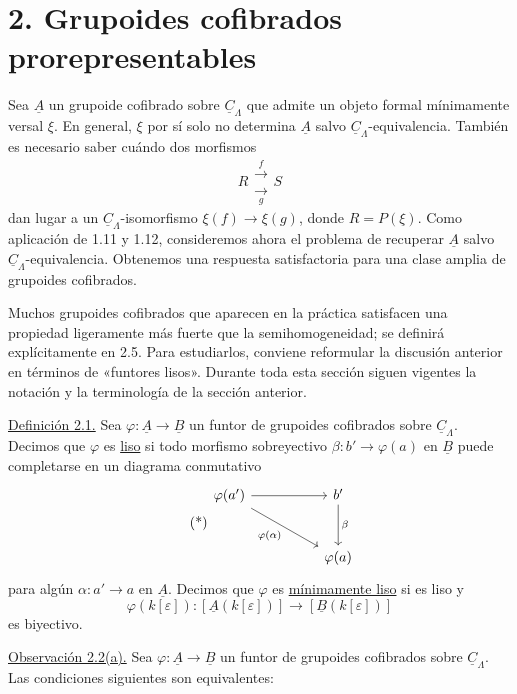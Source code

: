 \section*{2. Grupoides cofibrados prorepresentables}

Sea $\underline A$ un grupoide cofibrado sobre
$\underline C_\Lambda$ que admite un objeto formal mínimamente versal
$\xi$. En general, $\xi$ por sí solo no determina $\underline A$
salvo $\underline C_\Lambda$-equivalencia. También es necesario saber
cuándo dos morfismos
\[
 R\mathrel{\substack{\xrightarrow{\ f\ }\\[-.6ex]
                      \xrightarrow[\ g\ ]{}}}S
\]
dan lugar a un $\underline C_\Lambda$-isomorfismo
$\xi(f)\longrightarrow\xi(g)$, donde $R=P(\xi)$. Como aplicación de
1.11 y 1.12, consideremos ahora el problema de recuperar $\underline A$
salvo $\underline C_\Lambda$-equivalencia. Obtenemos una respuesta
satisfactoria para una clase amplia de grupoides cofibrados.


Muchos grupoides cofibrados que aparecen en la práctica satisfacen una
propiedad ligeramente más fuerte que la semihomogeneidad; se definirá
explícitamente en 2.5. Para estudiarlos, conviene reformular la
discusión anterior en términos de «funtores lisos». Durante toda esta
sección siguen vigentes la notación y la terminología de la sección
anterior.

\underline{Definición 2.1.} Sea
$\varphi:\underline A\longrightarrow\underline B$ un funtor de
grupoides cofibrados sobre $\underline C_\Lambda$. Decimos que
$\varphi$ es \underline{liso} si todo morfismo sobreyectivo
$\beta:b'\longrightarrow\varphi(a)$ en $\underline B$ puede
completarse en un diagrama conmutativo
\begin{equation}\tag{*}
\begin{tikzcd}[row sep=large,column sep=huge]
 \varphi(a') \arrow[r] \arrow[dr,"{\varphi(\alpha)}"']
 & b' \arrow[d,"\beta"]\\
 & \varphi(a)
\end{tikzcd}
\end{equation}
para algún $\alpha:a'\longrightarrow a$ en $\underline A$. Decimos
que $\varphi$ es \underline{mínimamente liso} si es liso y
\[
 \varphi(k[\varepsilon]):
 [\underline A(k[\varepsilon])]
 \longrightarrow
 [\underline B(k[\varepsilon])]
\]
es biyectivo.

\underline{Observación 2.2(a).} Sea
$\varphi:\underline A\longrightarrow\underline B$ un funtor de
grupoides cofibrados sobre $\underline C_\Lambda$. Las condiciones
siguientes son equivalentes:

